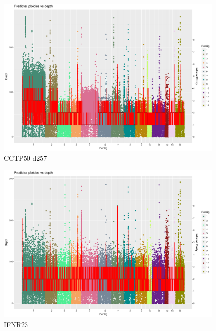 \documentclass[11pt]{article}
\begin{document}
\begin{figure}[H]
\begin{center}
\caption{CCTP50-d257}
\includegraphics[scale=0.5]{Plots/Sample_5_plot.pdf}
\end{center}
\end{figure}
\begin{figure}[H]
\begin{center}
\caption{IFNR23}
\includegraphics[scale=0.5]{Plots/Sample_16_plot.pdf}
\end{center}
\end{figure}
\end{document}
